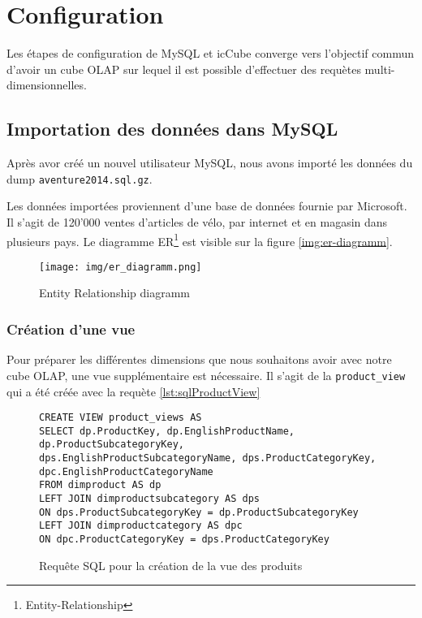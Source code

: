 \chapter{Configuration}

Les étapes de configuration de MySQL et icCube converge vers l'objectif commun d'avoir un cube OLAP sur lequel il est possible d'effectuer des requètes multi-dimensionnelles. 

\section{Importation des données dans MySQL}

Après avor créé un nouvel utilisateur MySQL, nous avons importé les données du dump \texttt{aventure2014.sql.gz}.

Les données importées proviennent d'une base de données fournie par Microsoft. Il s'agit de 120'000 ventes d'articles de vélo, par internet et en magasin dans plusieurs pays. Le diagramme ER\footnote{Entity-Relationship} est visible sur la figure \autoref{img:er-diagramm}. 

\begin{figure}[H]
    \centering
    \texttt{[image: img/er\_diagramm.png]}
    \caption{Entity Relationship diagramm}
    \label{img:er-diagramm}
\end{figure}

\subsection{Création d'une vue}

Pour préparer les différentes dimensions que nous souhaitons avoir avec notre cube OLAP, une vue supplémentaire est nécessaire. Il s'agit de la \texttt{product\_view} qui a été créée avec la requète \autoref{lst:sqlProductView}

\begin{figure}[H]
\centering
\begin{lstlisting}	
CREATE VIEW product_views AS 
SELECT dp.ProductKey, dp.EnglishProductName, dp.ProductSubcategoryKey, dps.EnglishProductSubcategoryName, dps.ProductCategoryKey, dpc.EnglishProductCategoryName 
FROM dimproduct AS dp 
LEFT JOIN dimproductsubcategory AS dps 
ON dps.ProductSubcategoryKey = dp.ProductSubcategoryKey 
LEFT JOIN dimproductcategory AS dpc 
ON dpc.ProductCategoryKey = dps.ProductCategoryKey
\end{lstlisting}
\caption{Requête SQL pour la création de la vue des produits}
\label{lst:sqlProductView}
\end{figure}


